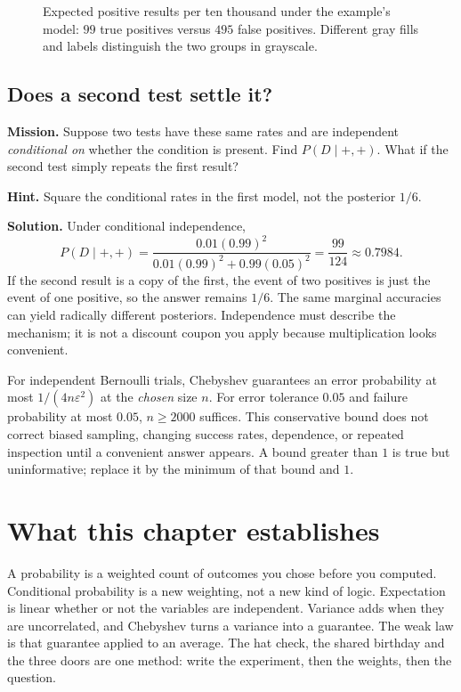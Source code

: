 \begin{figure}[ht]\centering{}
\caption{Expected positive results per ten thousand under the example's model: $99$ true positives versus $495$ false positives. Different gray fills and labels distinguish the two groups in grayscale.}\end{figure}

\subsection*{Does a second test settle it?}
\textbf{Mission.} Suppose two tests have these same rates and are independent \emph{conditional on} whether the condition is present. Find $P(D\mid+,+)$. What if the second test simply repeats the first result?

\textbf{Hint.} Square the conditional rates in the first model, not the posterior $1/6$.

\textbf{Solution.} Under conditional independence,
\[
P(D\mid+,+)=\frac{0.01(0.99)^2}{0.01(0.99)^2+0.99(0.05)^2}
=\frac{99}{124}\approx0.7984.
\]
If the second result is a copy of the first, the event of two positives is just the event of one positive, so the answer remains $1/6$. The same marginal accuracies can yield radically different posteriors. Independence must describe the mechanism; it is not a discount coupon you apply because multiplication looks convenient.

\begin{reminder}
For independent Bernoulli trials, Chebyshev guarantees an error probability at most $1/(4n\varepsilon^2)$ at the \emph{chosen} size $n$. For error tolerance $0.05$ and failure probability at most $0.05$, $n\ge2000$ suffices. This conservative bound does not correct biased sampling, changing success rates, dependence, or repeated inspection until a convenient answer appears. A bound greater than $1$ is true but uninformative; replace it by the minimum of that bound and $1$.
\end{reminder}

\section*{What this chapter establishes}
A probability is a weighted count of outcomes you chose before you computed. Conditional probability is a new weighting, not a new kind of logic. Expectation is linear whether or not the variables are independent. Variance adds when they are uncorrelated, and Chebyshev turns a variance into a guarantee. The weak law is that guarantee applied to an average. The hat check, the shared birthday and the three doors are one method: write the experiment, then the weights, then the question.

